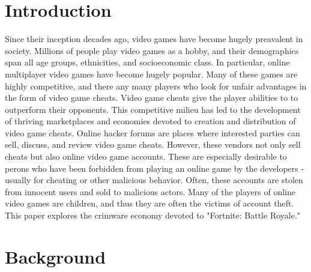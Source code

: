 \documentclass[sigconf]{acmart}
\begin{document}
  

\maketitle

\section{Introduction}

Since their inception decades ago, video games have become hugely preavalent in
society. Millions of people play video games as a hobby, and their demographics
span all age groups, ethnicities, and socioeconomic class. In particular, online
multiplayer video games have become hugely popular. Many of these games are 
highly competitive, and there any many players who look for unfair advantages in
the form of video game cheats. Video game cheats give the player abilities to 
to outperform their opponents. This competitive milieu has led to the
development of thriving marketplaces and economies devoted to creation and 
distribution of video game cheats. Online hacker forums are places where 
interested parties can sell, discuss, and review video game cheats. However, 
these vendors not only sell cheats but also online video game accounts. These
are especially desirable to perons who have been forbidden from playing an 
online game by the developers - usually for cheating or other malicious
behavior. Often, these accounts are stolen from innocent users and sold to 
malicious actors. Many of the players of online video games are 
children, and thus they are often the victims of account theft. This paper 
explores the crimware economy devoted to "Fortnite: Battle Royale."

\section{Background}
\end{document}
